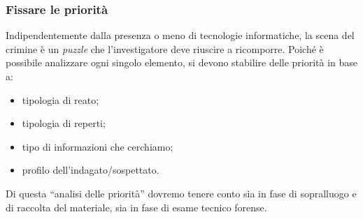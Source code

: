 \documentclass[11pt]{beamer}
\begin{document}
	\begin{frame}
		\frametitle{Fissare le priorità}
		Indipendentemente dalla presenza o meno di tecnologie informatiche, la scena del crimine è un \textit{puzzle} che l'investigatore deve riuscire a ricomporre. 
		\vfill
		Poiché è possibile analizzare ogni singolo elemento, si devono stabilire delle priorità in base a:
		\begin{itemize}
			\item tipologia di reato;
			\item tipologia di reperti;
			\item tipo di informazioni che cerchiamo;
			\item profilo dell'indagato/sospettato.
		\end{itemize}
		\vfill
		Di questa ``analisi delle priorità'' dovremo tenere conto sia in fase di sopralluogo e di raccolta del materiale, sia in fase di esame tecnico forense.
	\end{frame}
\end{document}
